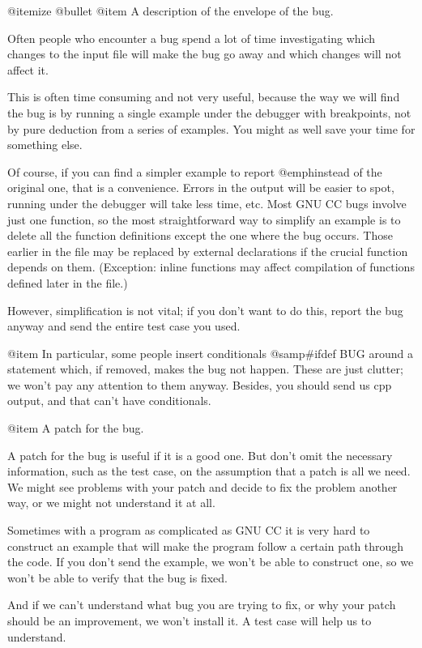 @itemize @bullet
@item
A description of the envelope of the bug.

Often people who encounter a bug spend a lot of time investigating
which changes to the input file will make the bug go away and which
changes will not affect it.

This is often time consuming and not very useful, because the way we
will find the bug is by running a single example under the debugger with
breakpoints, not by pure deduction from a series of examples.  You might
as well save your time for something else.

Of course, if you can find a simpler example to report @emph{instead} of
the original one, that is a convenience.  Errors in the output will be
easier to spot, running under the debugger will take less time, etc.
Most GNU CC bugs involve just one function, so the most straightforward
way to simplify an example is to delete all the function definitions
except the one where the bug occurs.  Those earlier in the file may be
replaced by external declarations if the crucial function depends on
them.  (Exception: inline functions may affect compilation of functions
defined later in the file.)

However, simplification is not vital; if you don't want to do this,
report the bug anyway and send the entire test case you used.

@item
In particular, some people insert conditionals @samp{#ifdef BUG} around
a statement which, if removed, makes the bug not happen.  These are just
clutter; we won't pay any attention to them anyway.  Besides, you should
send us cpp output, and that can't have conditionals.

@item
A patch for the bug.

A patch for the bug is useful if it is a good one.  But don't omit the
necessary information, such as the test case, on the assumption that a
patch is all we need.  We might see problems with your patch and decide
to fix the problem another way, or we might not understand it at all.

Sometimes with a program as complicated as GNU CC it is very hard to
construct an example that will make the program follow a certain path
through the code.  If you don't send the example, we won't be able to
construct one, so we won't be able to verify that the bug is fixed.

And if we can't understand what bug you are trying to fix, or why your
patch should be an improvement, we won't install it.  A test case will
help us to understand.

